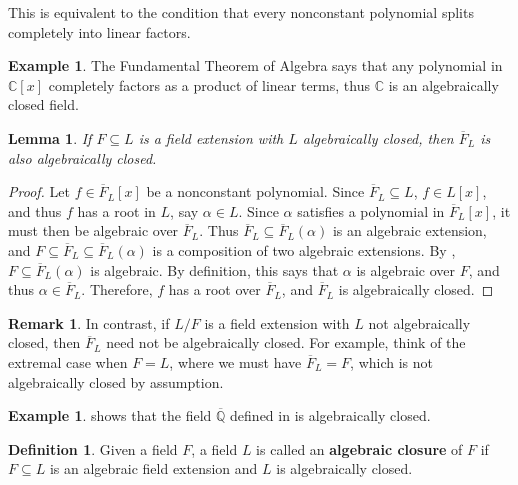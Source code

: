 \documentclass[12pt]{report}
\newtheorem{lemma}[theorem]{Lemma}
\numberwithin{equation}{section}
\numberwithin{theorem}{chapter}
\theoremstyle{definition}
\newtheorem{definition}[theorem]{Definition}
\newtheorem{example}[theorem]{Example}
\newtheorem*{basic properties}{Basic Properties}
\newtheorem*{Important Remark}{Important Remark}
\newtheorem{remark}[theorem]{Remark}
\newcommand{\df}[1]{{\bf #1}\index{#1}}
\newcommand{\C}{\mathbb{C}}
\begin{document}
This is equivalent to the condition that every nonconstant polynomial splits completely into linear factors.	
  
  
\begin{example}
The Fundamental Theorem of Algebra says that any polynomial in $\C[x]$ completely factors as a product of linear terms, thus $\C$ is an algebraically closed field.
\end{example}


\begin{lemma}\label{remark alg closure is algclosed}
	If $F \subseteq L$ is a field extension with $L$ algebraically closed, then $\overline{F}_L$ is also algebraically closed.
\end{lemma}

\begin{proof}
Let $f \in \overline{F}_L[x]$ be a nonconstant polynomial. Since $\overline{F}_L \subseteq L$, $f \in L[x]$, and thus $f$ has a root in $L$, say $\alpha \in L$. Since $\alpha$ satisfies a polynomial in $\overline{F}_L[x]$, it must then be algebraic over $\overline{F}_L$. Thus $\overline{F}_L \subseteq \overline{F}_L(\alpha)$ is an algebraic extension, and $F \subseteq \overline{F}_L \subseteq \overline{F}_L(\alpha)$ is a composition of two algebraic extensions. By , $F \subseteq \overline{F}_L(\alpha)$ is algebraic. By definition, this says that $\alpha$ is algebraic over $F$, and thus $\alpha \in \overline{F}_L$. Therefore, $f$ has a root over $\overline{F}_L$, and $\overline{F}_L$ is algebraically closed.
\end{proof}


\begin{remark}\label{remark alg closure inside not alg closed field}
In contrast, if $L/F$ is a field extension with $L$ not algebraically closed, then $\overline{F}_L$ need not be algebraically closed. For example, think of the extremal case when $F=L$, where we must have $\overline{F}_L=F$, which is not algebraically closed by assumption.
\end{remark}



\begin{example}
	 shows that the field $\overline{\mathbb{Q}}$ defined in  is algebraically closed.
\end{example}




\begin{definition}
Given a field $F$, a field $L$ is called an \df{algebraic closure} of $F$ if $F \subseteq L$ is an algebraic field extension and $L$ is algebraically closed.
\end{definition}
\end{document}
